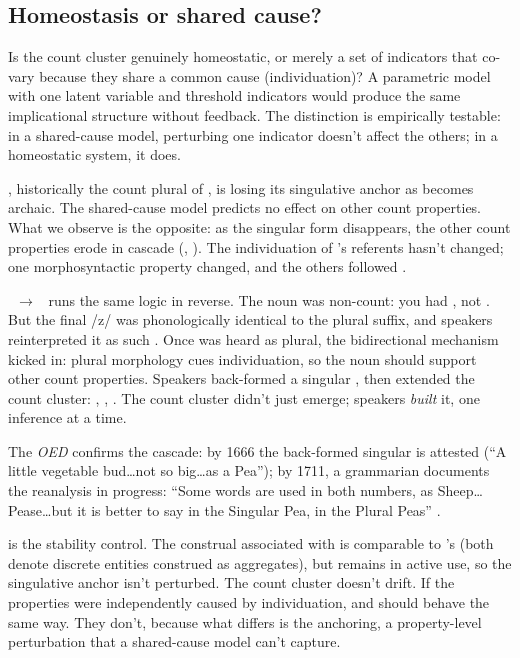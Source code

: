 \documentclass[12pt,a4paper]{article}
\begin{document}
\subsection{Homeostasis or shared cause?}

Is the count cluster genuinely homeostatic, or merely a set of indicators that co-vary because they share a common cause (individuation)? A parametric model with one latent variable and threshold indicators would produce the same implicational structure without feedback. The distinction is empirically testable: in a shared-cause model, perturbing one indicator doesn't affect the others; in a homeostatic system, it does.

, historically the count plural of , is losing its singulative anchor as  becomes archaic. The shared-cause model predicts no effect on other count properties. What we observe is the opposite: as the singular form disappears, the other count properties erode in cascade (, ). The individuation of 's referents hasn't changed; one morphosyntactic property changed, and the others followed \citep{garner2016}.

~$\to$~ runs the same logic in reverse. The noun was non-count: you had , not . But the final /z/ was phonologically identical to the plural suffix, and speakers reinterpreted it as such \citep[s.v.\ , \textit{n.\textsuperscript{1}}]{oed}. Once  was heard as plural, the bidirectional mechanism kicked in: plural morphology cues individuation, so the noun should support other count properties. Speakers back-formed a singular , then extended the count cluster: , , . The count cluster didn't just emerge; speakers \textit{built} it, one inference at a time.

The \textit{OED} confirms the cascade: by 1666 the back-formed singular is attested (\enquote{A little vegetable bud\ldots not so big\ldots as a Pea}); by 1711, a grammarian documents the reanalysis in progress: \enquote{Some words are used in both numbers, as Sheep\ldots Pease\ldots but it is better to say in the Singular Pea, in the Plural Peas} \citep[p.~49]{greenwood1711}.

 is the stability control. The construal associated with  is comparable to 's (both denote discrete entities construed as aggregates), but  remains in active use, so the singulative anchor isn't perturbed. The count cluster doesn't drift. If the properties were independently caused by individuation,  and  should behave the same way. They don't, because what differs is the anchoring, a property-level perturbation that a shared-cause model can't capture.
\end{document}
